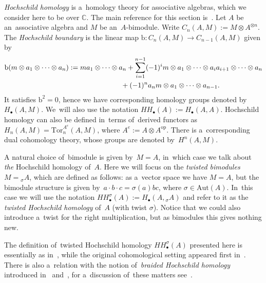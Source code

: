 \documentclass[10pt,a4paper]{amsart}
\numberwithin{equation}{section}
\begin{document}
\emph{Hoch\-schild homology} is a~homology theory for associative algebras, which we consider here to be over $\mathbb{C}$.
The main reference for this section is~\cite{loday}.
Let $A$ be an~associative algebra and $M$ be an~$A$-bimodule.
Write $C_n (A, M) := M \otimes A^{\otimes n}$. The \emph{Hoch\-schild boundary} is the linear map $\mathrm{b}\colon C_n (A, M) \to C_{n - 1} (A, M)$ given by
\begin{gather*}
\mathrm{b} (m \otimes a_1 \otimes \cdots \otimes a_n) := m a_1 \otimes \cdots \otimes a_n
+ \sum_{i = 1}^{n - 1} (-1)^i m \otimes a_1 \otimes \cdots \otimes a_i a_{i + 1} \otimes \cdots \otimes a_n
 \\ \hphantom{\mathrm{b} (m \otimes a_1 \otimes \cdots \otimes a_n) :=}
{} + (-1)^n a_n m \otimes a_1 \otimes \cdots \otimes a_{n - 1}.
\end{gather*}
It satisfies $\mathrm{b}^2 = 0$, hence we have corresponding homology groups denoted by~$H_\bullet(A, M)$.
We~will also use the notation $HH_\bullet(A) := H_\bullet(A, A)$.
Hoch\-schild homology can also be defined in~terms of~derived functors as $H_n(A, M) = \mathrm{Tor}^{A^e}_n(A, M)$, where $A^e := A \otimes A^\mathrm{op}$.
There is a~corresponding dual cohomology theory, whose groups are denoted by~$H^n(A, M)$.

A natural choice of~bimodule is given by~$M = A$, in~which case we talk about \emph{the} Hoch\-schild homology of~$A$.
Here we will focus on the \emph{twisted bimodules} $M = {}_\sigma A$, which are defined as follows: as a~vector space we have $M = A$, but the bimodule structure is given by~$a \cdot b \cdot c = \sigma(a) b c $, where $\sigma \in \mathrm{Aut}(A)$.
In~this case we will use the notation $HH^\sigma_\bullet(A) := H_\bullet(A, {}_\sigma A)$ and refer to it as the \emph{twisted Hoch\-schild homology} of~$A$ (with twist $\sigma$).
Notice that we could also introduce a~twist for the right multiplication, but as bimodules this gives nothing new.

\begin{Remark}
The definition of~twisted Hoch\-schild homology $HH^\sigma_\bullet(A)$ presented here is essen\-ti\-ally as in~\cite{twisted-su2}, while the original cohomological setting appeared first in~\cite{kmt}.
There is also a~relation with the notion of~\emph{braided Hoch\-schild homology} introduced in~\cite{akrami-majid} and~\cite{baez}, for a~discussion of~these matters see~\cite[Example~3.9]{braided-homology}.
\end{Remark}
\end{document}
